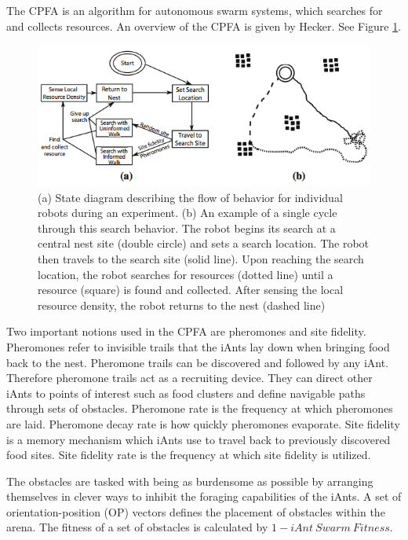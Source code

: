 \documentclass{acm_proc_article-sp}
\begin{document}
The CPFA is an algorithm for autonomous swarm systems, which searches for and collects resources. An overview of the CPFA is given by Hecker\cite{hecker:CPFA}. See Figure \ref{fig:CPFA}.

\begin{figure}[t]
	\includegraphics[width=18cm]{images/CPFA}
	\caption{(a) State diagram describing the flow of behavior for individual robots during an experiment. (b) An example of a single cycle through this search behavior. The robot begins its search at a central nest site (double circle) and sets a search location. The robot then travels to the search site (solid line). Upon reaching the search location, the robot searches for resources (dotted line) until a resource (square) is found and collected. After sensing the local resource density, the robot returns to the nest (dashed line)
	\cite{hecker:CPFA}} 
	\label{fig:CPFA}
\end{figure}

Two important notions used in the CPFA are pheromones and site fidelity. Pheromones refer to invisible trails that the iAnts lay down when bringing food back to the nest. Pheromone trails can be discovered and followed by any iAnt. Therefore pheromone trails act as a recruiting device. They can direct other iAnts to points of interest such as food clusters and define navigable paths through sets of obstacles. Pheromone rate is the frequency at which pheromones are laid. Pheromone decay rate is how quickly pheromones evaporate. Site fidelity is a memory mechanism which iAnts use to travel back to previously discovered food sites. Site fidelity rate is the frequency at which site fidelity is utilized.

The obstacles are tasked with being as burdensome as possible by arranging themselves in clever ways to inhibit the foraging capabilities of the iAnts. A set of orientation-position (OP) vectors defines the placement of obstacles within the arena. The fitness of a set of obstacles is calculated by $1 - iAnt\ Swarm\ Fitness$.
\end{document}
